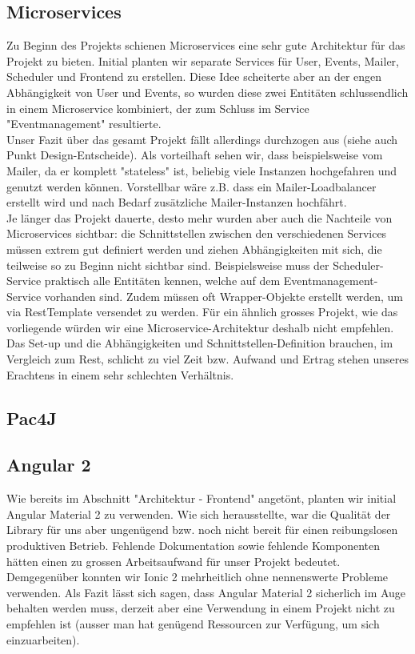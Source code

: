 \documentclass[11pt]{article} %
\begin{document}
\subsection{Microservices}
Zu Beginn des Projekts schienen Microservices eine sehr gute Architektur für das Projekt zu bieten. Initial planten wir separate Services für User, Events, Mailer, Scheduler und Frontend zu erstellen. Diese Idee scheiterte aber an der engen Abhängigkeit von User und Events, so wurden diese zwei Entitäten schlussendlich in einem Microservice kombiniert, der zum Schluss im Service "Eventmanagement" resultierte.
\\
Unser Fazit über das gesamt Projekt fällt allerdings durchzogen aus (siehe auch Punkt Design-Entscheide). Als vorteilhaft sehen wir, dass beispielsweise vom Mailer, da er komplett "stateless" ist, beliebig viele Instanzen hochgefahren und genutzt werden können. Vorstellbar wäre z.B. dass ein Mailer-Loadbalancer erstellt wird und nach Bedarf zusätzliche Mailer-Instanzen hochfährt.
\\
Je länger das Projekt dauerte, desto mehr wurden aber auch die Nachteile von Microservices sichtbar: die Schnittstellen zwischen den verschiedenen Services müssen extrem gut definiert werden und ziehen Abhängigkeiten mit sich, die teilweise so zu Beginn nicht sichtbar sind. Beispielsweise muss der Scheduler-Service praktisch alle Entitäten kennen, welche auf dem Eventmanagement-Service vorhanden sind. Zudem müssen oft Wrapper-Objekte erstellt werden, um via RestTemplate versendet zu werden. Für ein ähnlich grosses Projekt, wie das vorliegende würden wir eine Microservice-Architektur deshalb nicht empfehlen. Das Set-up und die Abhängigkeiten und Schnittstellen-Definition brauchen, im Vergleich zum Rest, schlicht zu viel Zeit bzw. Aufwand und Ertrag stehen unseres Erachtens in einem sehr schlechten Verhältnis.

\subsection{Pac4J}

\subsection{Angular 2}
Wie bereits im Abschnitt "Architektur - Frontend" angetönt, planten wir initial Angular Material 2 zu verwenden. Wie sich herausstellte, war die Qualität der Library für uns aber ungenügend bzw. noch nicht bereit für einen reibungslosen produktiven Betrieb. Fehlende Dokumentation sowie fehlende Komponenten hätten einen zu grossen Arbeitsaufwand für unser Projekt bedeutet. Demgegenüber konnten wir Ionic 2 mehrheitlich ohne nennenswerte Probleme verwenden. Als Fazit lässt sich sagen, dass Angular Material 2 sicherlich im Auge behalten werden muss, derzeit aber eine Verwendung in einem Projekt nicht zu empfehlen ist (ausser man hat genügend Ressourcen zur Verfügung, um sich einzuarbeiten).
\end{document}
